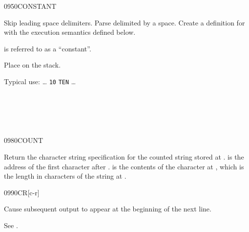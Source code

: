 \begin{worddef}{0950}{CONSTANT}
\item {}

	Skip leading space delimiters. Parse  delimited by
	a space. Create a definition for  with the execution
	semantics defined below.

	 is referred to as a ``constant''.

\execute[name]

	Place  on the stack.


	\begin{rationale} %
		Typical use: {\ldots}
			 \texttt{10}  \texttt{TEN}
			{\ldots}
	\end{rationale}

	\begin{testing} %
		 \\

		 \\
		 \\
	\end{testing}
\end{worddef}


\begin{worddef}{0980}{COUNT}
\item {}

	Return the character string specification for the counted
	string stored at .  is the
	address of the first character after . 
	is the contents of the character at , which is
	the length in characters of the string at .

	\begin{testing} %
	\end{testing}
\end{worddef}

\vspace*{-1ex}
\begin{worddef}{0990}{CR}[c-r]
\item \stack{}{}

	Cause subsequent output to appear at the beginning of the next
	line.

	\begin{testing} %
		See .
	\end{testing}
\end{worddef}

